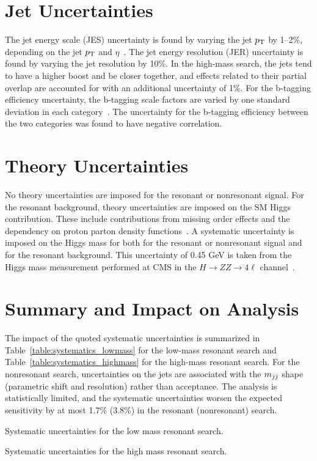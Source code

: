 \section{Jet Uncertainties\label{sec:jetunc}}

The jet energy scale (JES) uncertainty is found by varying the jet $p_{\rm T}$ by 1--2\%,
depending on the jet $p_{\rm T}$ and $\eta$~\cite{JINST6}.
The jet energy resolution (JER) uncertainty is found by varying the jet resolution by 10\%.
In the high-mass search, the jets tend to have a higher boost and be closer together,
and effects related to their partial overlap are accounted for with an additional uncertainty of 1\%.
For the b-tagging efficiency uncertainty, the b-tagging scale factors are varied by one standard
deviation in each category~\cite{BTV}. 
The uncertainty for the b-tagging efficiency between the two categories
was found to have negative correlation.

\section{Theory Uncertainties\label{sec:theoryunc}}

No theory uncertainties are imposed for the resonant or nonresonant signal.
For the resonant background, theory uncertainties are imposed on the SM Higgs contribution. These
include contributions from missing order effects and the dependency on proton parton density
functions~\cite{Dittmaier:2011ti,LHC:SMHiggsBR}.
A systematic uncertainty is imposed on the Higgs mass for both for the resonant or nonresonant signal
and for the resonant background.
This uncertainty of 0.45 GeV is taken from the Higgs mass measurement performed at CMS in the
$H\rightarrow ZZ \rightarrow 4\ell$ channel~\cite{Chatrchyan:2013mxa}.

\section{Summary and Impact on Analysis\label{sec:uncimpact}}

The impact of the quoted systematic uncertainties is summarized in
Table~\ref{table:systematics_lowmass} for the low-mass resonant search and
Table~\ref{table:systematics_highmass} for the high-mass resonant search.
For the nonresonant search, uncertainties on the jets are
associated with the $m_{jj}$ shape (parametric shift and resolution) rather than acceptance.
The analysis is statistically limited, and the systematic uncertainties worsen the expected sensitivity
by at most 1.7\% (3.8\%) in the resonant (nonresonant) search.

\begin{table}[htbp!]
  \centering
  \renewcommand{\arraystretch}{1.4}
  \caption{Systematic uncertainties for the low mass resonant search.}
  
  \label{table:systematics_lowmass}
\end{table}

\begin{table}[htbp!]
  \centering
  \renewcommand{\arraystretch}{1.4}
  \caption{Systematic uncertainties for the high mass resonant search.}
  
  \label{table:systematics_highmass}
\end{table}
